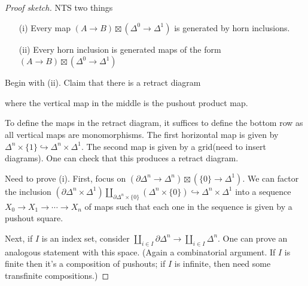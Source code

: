 \documentclass{article}
\theoremstyle{definition}
\theoremstyle{remark}
\theoremstyle{plain}
\begin{document}
\begin{proof}[Proof sketch]
    NTS two things
    \begin{enumerate}
        \item[(i)] Every map $(A\to B)\boxtimes (\Delta^0\to \Delta^1)$ is generated by horn inclusions.
        \item[(ii)] Every horn inclusion is generated maps of the form $(A\to B)\boxtimes(\Delta^0\to\Delta^1)$
    \end{enumerate}
    Begin with (ii). Claim that there is a retract diagram
    \begin{center}
    \end{center}
    where the vertical map in the middle is the pushout product map.

    To define the maps in the retract diagram, it suffices to define the bottom row as all vertical maps are monomorphisms. The first horizontal map is given by $\Delta^n\times\{1\}\hookrightarrow\Delta^n\times\Delta^1$. The second map is given by a grid(need to insert diagrams). One can check that this produces a retract diagram.

    Need to prove (i). First, focus on $(\partial \Delta^n\to\Delta^n)\boxtimes(\{0\}\to\Delta^1)$. We can factor the inclusion $(\partial\Delta^n\times\Delta^1)\coprod_{\partial \Delta^n\times \{0\}}(\Delta^n\times\{0\})\hookrightarrow\Delta^n\times\Delta^1$ into a sequence $X_0\to X_1\to\cdots\to X_n$ of maps such that each one in the sequence is given by a pushout square.

    Next, if $I$ is an index set, consider $\coprod_{i\in I}\partial \Delta^n\to\coprod_{i\in I}\Delta^n$. One can prove an analogous statement with this space. (Again a combinatorial argument. If $I$ is finite then it's a composition of pushouts; if $I$ is infinite, then need some transfinite compositions.)


\end{proof}
\end{document}
